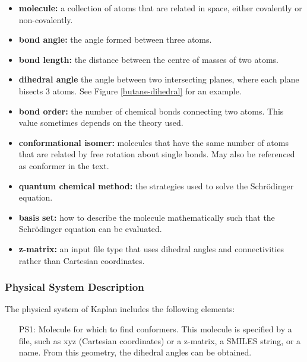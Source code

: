 \documentclass[12pt]{article}
\newcommand{\progname}{Kaplan} %
\begin{document}
\begin{itemize}
\item \textbf{molecule:} a collection of atoms that are related in space, 
either covalently or non-covalently.
\item \textbf{bond angle:} the angle formed between three atoms.
\item \textbf{bond length:} the distance between the centre of masses of two 
atoms.
\item \textbf{dihedral angle} the angle between two intersecting planes, where 
each plane bisects 3 atoms. See Figure \ref{butane-dihedral} for an example.
\item \textbf{bond order:} the number of chemical bonds connecting two atoms. 
This value sometimes depends on the theory used.
\item \textbf{conformational isomer:} molecules that have the same number of 
atoms that are related by free rotation about single bonds. May also be 
referenced as conformer in the text. 
\item \textbf{quantum chemical method:} the strategies used to solve the 
Schr\"{o}dinger equation.
\item \textbf{basis set:} how to describe the molecule mathematically such that 
the Schr\"{o}dinger equation can be evaluated.
\item \textbf{z-matrix:} an input file type that uses dihedral angles and 
connectivities rather than Cartesian coordinates.
\end{itemize}

\subsubsection{Physical System Description}

The physical system of \progname{} includes the following elements:

\begin{itemize}

\item[PS1:] Molecule for which to find conformers. This molecule is specified 
by a file, such as xyz (Cartesian coordinates) or a 
z-matrix, a SMILES string, 
or a name. From this geometry, the dihedral angles can be obtained.

\end{itemize}
\end{document}
